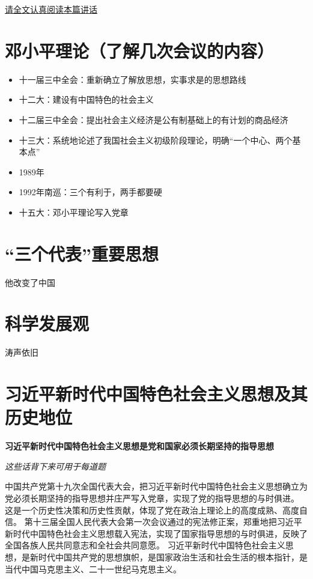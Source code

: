 \documentclass[a4paper, UTF8]{ctexart}
\begin{document}
    \href{http://www.xinhuanet.com//politics/2013-12/26/c_118723453.htm}{请全文认真阅读本篇讲话}

\section{邓小平理论（了解几次会议的内容）}
    \begin{itemize}
        \item 十一届三中全会：重新确立了解放思想，实事求是的思想路线
        \item 十二大：建设有中国特色的社会主义
        \item 十二届三中全会：提出社会主义经济是公有制基础上的有计划的商品经济
        \item 十三大：系统地论述了我国社会主义初级阶段理论，明确“一个中心、两个基本点”
        \item 1989年
        \item 1992年南巡：三个有利于，两手都要硬
        \item 十五大：邓小平理论写入党章
    \end{itemize}

\section{“三个代表”重要思想}
    他改变了中国

\section{科学发展观}
    涛声依旧

\section{习近平新时代中国特色社会主义思想及其历史地位}
    \textbf{习近平新时代中国特色社会主义思想是党和国家必须长期坚持的指导思想}

    \emph{这些话背下来可用于每道题}
    
    中国共产党第十九次全国代表大会，把习近平新时代中国特色社会主义思想确立为党必须长期坚持的指导思想并庄严写入党章，实现了党的指导思想的与时俱进。
    这是一个历史性决策和历史性贡献，体现了党在政治上理论上的高度成熟、高度自信。
    第十三届全国人民代表大会第一次会议通过的宪法修正案，郑重地把习近平新时代中国特色社会主义思想载入宪法，实现了国家指导思想的与时俱进，反映了全国各族人民共同意志和全社会共同意愿。
    习近平新时代中国特色社会主义思想，是新时代中国共产党的思想旗帜，是国家政治生活和社会生活的根本指针，是当代中国马克思主义、二十一世纪马克思主义。
\end{document}
